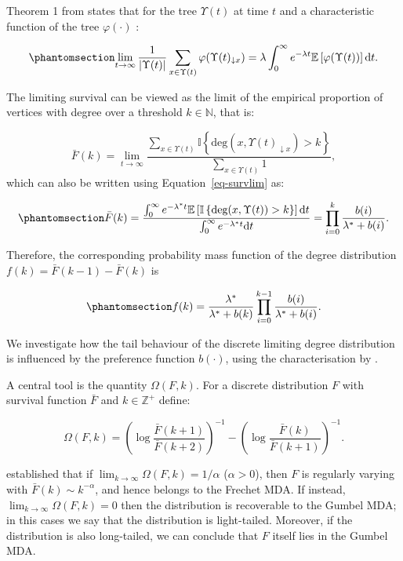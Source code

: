 \documentclass[
  sn-basic,
  10pt,
]{sn-jnl}
\theoremstyle{plain}
\theoremstyle{plain}
\theoremstyle{remark}
\begin{document}
Theorem 1 from \citet{rudas07} states that for the tree \(\Upsilon(t)\)
at time \(t\) and a characteristic function of the tree
\(\varphi(\cdot)\) :

\begin{equation}\phantomsection\label{eq-survlim}{
\lim_{t\rightarrow\infty}\frac{1}{|\Upsilon(t)|}\sum_{x\in\Upsilon(t)}\varphi(\Upsilon(t)_{\downarrow x}) = \lambda \int_0^\infty e^{-\lambda t}\mathbb E\left[\varphi(\Upsilon(t))\right]\text{d}t.
}\end{equation}

The limiting survival can be viewed as the limit of the empirical
proportion of vertices with degree over a threshold \(k\in\mathbb N\),
that is:

\[
\bar F(k) = \lim_{t\rightarrow\infty}\frac{\sum_{x\in\Upsilon(t)}\mathbb I\left\{\text{deg}(x,\Upsilon(t)_{\downarrow x})>k\right\}}{\sum_{x\in\Upsilon(t)} 1},
\] which can also be written using Equation~\ref{eq-survlim} as:

\begin{equation}\phantomsection\label{eq-surv-origin}{
\bar F(k) = \frac{\int_0^\infty e^{-\lambda^* t}\mathbb E\left[\mathbb I\left\{\text{deg}(x,\Upsilon(t))>k\right\}\right]\text{d}t}{\int_0^\infty e^{-\lambda^* t}\text{d}t} = \prod_{i=0}^k\frac{b(i)}{\lambda^* + b(i)}.
}\end{equation}

Therefore, the corresponding probability mass function of the degree
distribution \(f(k) = \bar F(k-1) - \bar F(k)\) is

\begin{equation}\phantomsection\label{eq-pmf-origin}{
f(k) = \frac{\lambda^*}{\lambda^* + b(k)}\prod_{i=0}^{k-1}\frac{b(i)}{\lambda^*+b(i)}.
}\end{equation}

We investigate how the tail behaviour of the discrete limiting degree
distribution is influenced by the preference function \(b(·)\), using
the characterisation by \citet{shimura12}.

A central tool is the quantity \(\Omega(F,k)\). For a discrete
distribution \(F\) with survival function \(\bar F\) and
\(k\in\mathbb Z^+\) define:

\[
\Omega(F,k) = \left(\log\displaystyle\frac{\bar F (k+1)}{\bar F (k+2)}\right)^{-1} - \left(\log\displaystyle\frac{\bar F (k)}{\bar F (k+1)}\right)^{-1}.
\]

\citet{shimura12} established that if
\(\lim_{k\rightarrow\infty} \Omega(F,k) = 1/\alpha\) (\(\alpha>0\)),
then \(F\) is regularly varying with \(\bar F(k) \sim k^{-\alpha}\), and
hence belongs to the Frechet MDA. If instead,
\(\lim_{k\rightarrow\infty} \Omega(F,k) = 0\) then the distribution is
recoverable to the Gumbel MDA; in this cases we say that the
distribution is light-tailed. Moreover, if the distribution is also
long-tailed, we can conclude that \(F\) itself lies in the Gumbel MDA.
\end{document}
